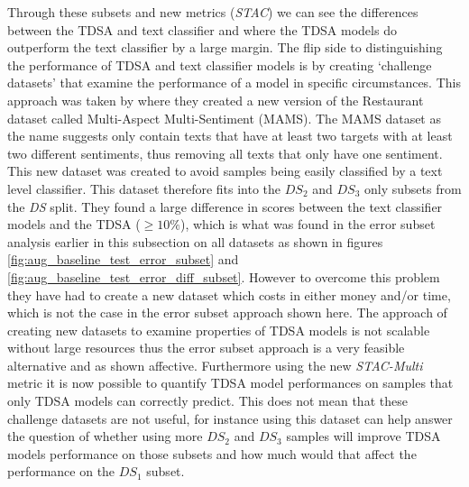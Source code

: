 Through these subsets and new metrics (\textit{STAC}) we can see the differences between the TDSA and text classifier and where the TDSA models do outperform the text classifier by a large margin. The flip side to distinguishing the performance of TDSA and text classifier models is by creating `challenge datasets' that examine the performance of a model in specific circumstances. This approach was taken by \citet{jiang-etal-2019-challenge} where they created a new version of the Restaurant dataset called Multi-Aspect Multi-Sentiment (MAMS). The MAMS dataset as the name suggests only contain texts that have at least two targets with at least two different sentiments, thus removing all texts that only have one sentiment. This new dataset was created to avoid samples being easily classified by a text level classifier. This dataset therefore fits into the $DS_2$ and $DS_3$ only subsets from the \textit{DS} split. They found a large difference in scores between the text classifier models and the TDSA ($\geq 10\%$), which is what was found in the error subset analysis earlier in this subsection on all datasets as shown in figures \ref{fig:aug_baseline_test_error_subset} and \ref{fig:aug_baseline_test_error_diff_subset}. However to overcome this problem they have had to create a new dataset which costs in either money and/or time, which is not the case in the error subset approach shown here. The approach of creating new datasets to examine properties of TDSA models is not scalable without large resources thus the error subset approach is a very feasible alternative and as shown affective. Furthermore using the new \textit{STAC-Multi} metric it is now possible to quantify TDSA model performances on samples that only TDSA models can correctly predict. This does not mean that these challenge datasets are not useful, for instance using this dataset can help answer the question of whether using more $DS_2$ and $DS_3$ samples will improve TDSA models performance on those subsets and how much would that affect the performance on the $DS_1$ subset.



